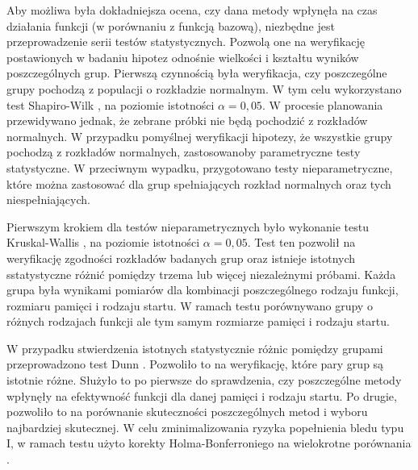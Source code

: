 Aby możliwa była dokładniejsza ocena, czy dana metody wpłynęła na czas działania funkcji (w porównaniu z funkcją bazową), niezbędne jest przeprowadzenie serii testów statystycznych.
Pozwolą one na weryfikację postawionych w badaniu hipotez odnośnie wielkości i kształtu wyników poszczególnych grup.
Pierwszą czynnością była weryfikacja, czy poszczególne grupy pochodzą z populacji o rozkładzie normalnym. 
W tym celu wykorzystano test Shapiro-Wilk \cite{eb32428d-e089-3d0c-8541-5f3e8f273532}, na poziomie istotności $\alpha = 0,05$.
W procesie planowania przewidywano jednak, że zebrane próbki nie będą pochodzić z rozkładów normalnych.
W przypadku pomyślnej weryfikacji hipotezy, że wszystkie grupy pochodzą z rozkładów normalnych, zastosowanoby parametryczne testy statystyczne.
W przeciwnym wypadku, przygotowano testy nieparametryczne, które można zastosować dla grup spełniających rozkład normalnych oraz tych niespełniających.

Pierwszym krokiem dla testów nieparametrycznych było wykonanie testu Kruskal-Wallis \cite{ac6c544c-0197-38bd-8c06-ec4f655ff4fd}, na poziomie istotności $\alpha = 0,05$.
Test ten pozwolił na weryfikację zgodności rozkładów badanych grup oraz istnieje istotnych sstatystyczne różnić pomiędzy trzema lub więcej niezależnymi próbami.
Każda grupa była wynikami pomiarów dla kombinacji poszczególnego rodzaju funkcji, rozmiaru pamięci i rodzaju startu.
W ramach testu porównywano grupy o różnych rodzajach funkcji ale tym samym rozmiarze pamięci i rodzaju startu.

W przypadku stwierdzenia istotnych statystycznie różnic pomiędzy grupami przeprowadzono test Dunn \cite{c3fa9fa7-dd2a-35f2-84a0-d5c07e68dd08}.
Pozwoliło to na weryfikację, które pary grup są istotnie różne.
Służyło to po pierwsze do sprawdzenia, czy poszczególne metody wpłynęły na efektywność funkcji dla danej pamięci i rodzaju startu.
Po drugie, pozwoliło to na porównanie skuteczności poszczególnych metod i wyboru najbardziej skutecznej.
W celu zminimalizowania ryzyka popełnienia bledu typu I, w ramach testu użyto korekty Holma-Bonferroniego na wielokrotne porównania \cite{29def780-e117-38f0-8afb-edf384af3fad}.